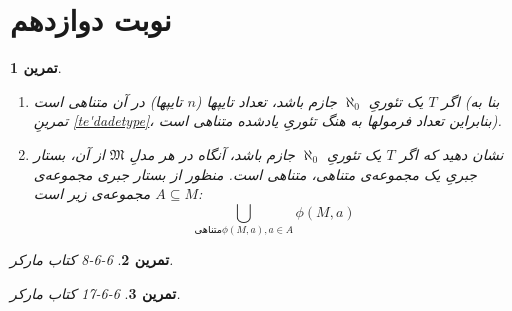 \documentclass[12pt,a4paper]{report}
\theoremstyle{colorhead}
\newtheorem{tam}{تمرین}
\begin{document}
\section{نوبت دوازدهم}
\begin{tam}\hfill
\begin{enumerate}
\item 
اگر
$T$
یک تئوریِ
$\aleph_0$
 جازم باشد، تعداد تایپها ($n$
تایپها)‌ در آن متناهی است (بنا به  تمرینِ
\ref{te'dadetype}،
 بنابراین تعداد فرمولها به هنگ تئوریِ یادشده متناهی است).
\item 
	نشان دهید که اگر
	$T$
	یک تئوریِ
	$\aleph_0$
	جازم باشد، آنگاه در هر مدلِ
	$\mathfrak{M}$
	از آن،‌ بستار جبریِ یک مجموعه‌ی متناهی، متناهی است. منظور از بستار جبری مجموعه‌ی
	$A\subseteq M$
	مجموعه‌ی زیر است:
	\[
	\bigcup_{ \text{متناهی} \phi(M,a), a\in A } \phi(M,a) 
	\]
\end{enumerate}
\end{tam}
\begin{tam}
6-6-8
کتاب مارکر.
\end{tam}
\begin{tam}
6-6-17
کتاب مارکر.
\end{tam} 
\end{document}
